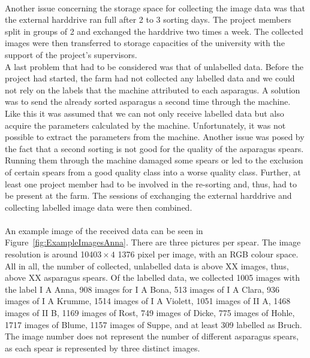\\
Another issue concerning the storage space for collecting the image data was that the external harddrive ran full after 2 to 3 sorting days. The project members split in groups of 2 and exchanged the harddrive two times a week. The collected images were then transferred to storage capacities of the university with the support of the project’s supervisors. \\
A last problem that had to be considered was that of unlabelled data. Before the project had started, the farm had not collected any labelled data and we could not rely on the labels that the machine attributed to each asparagus. A solution was to send the already sorted asparagus a second time through the machine. Like this it was assumed that we can not only receive labelled data but also acquire the parameters calculated by the machine. Unfortunately, it was not possible to extract the parameters from the machine. Another issue was posed by the fact that a second sorting is not good for the quality of the asparagus spears. Running them through the machine damaged some spears or led to the exclusion of certain spears from a good quality class into a worse quality class. Further, at least one project member had to be involved in the re-sorting and, thus, had to be present at the farm. The sessions of exchanging the external harddrive and collecting labelled image data were then combined. \\
\\
An example image of the received data can be seen in Figure~\ref{fig:ExampleImagesAnna}. There are three pictures per spear. The image resolution is around 1040$3\times4$ 1376 pixel per image, with an RGB colour space. \\
All in all, the number of collected, unlabelled data is above XX images, thus, above XX asparagus spears. Of the labelled data, we collected 1005 images with the label I A Anna,  908 images for I A Bona, 513 images of I A Clara, 936 images of I A Krumme, 1514 images of I A Violett, 1051 images of II A, 1468 images of II B, 1169 images of Rost, 749 images of Dicke, 775 images of Hohle, 1717 images of Blume, 1157 images of Suppe, and at least 309 labelled as Bruch. The image number does not represent the number of different asparagus spears, as each spear is represented by three distinct images. \\

